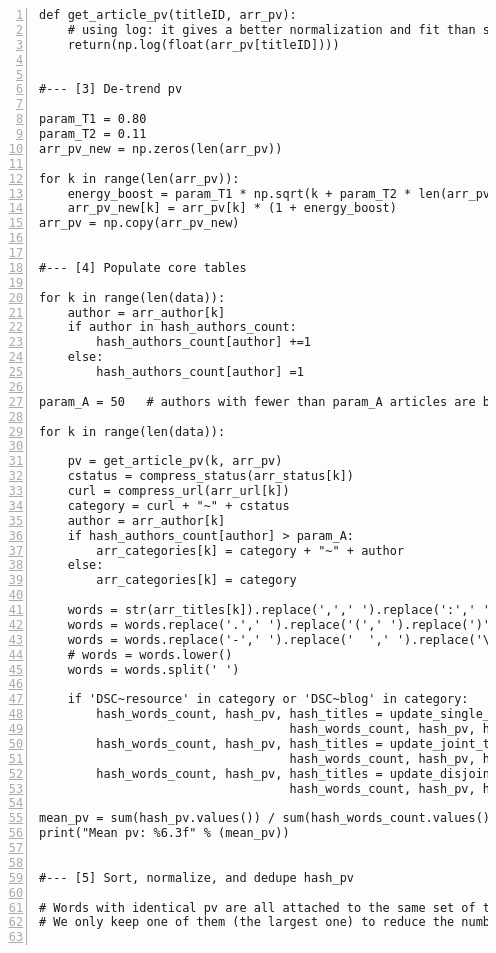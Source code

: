 \documentclass[oneside,10pt]{book}
\begin{document}
\begin{lstlisting}[numbers=left]
def get_article_pv(titleID, arr_pv):  
    # using log: it gives a better normalization and fit than sqrt, for pv distribution
    return(np.log(float(arr_pv[titleID])))


#--- [3] De-trend pv 

param_T1 = 0.80
param_T2 = 0.11 
arr_pv_new = np.zeros(len(arr_pv)) 

for k in range(len(arr_pv)):
    energy_boost = param_T1 * np.sqrt(k + param_T2 * len(arr_pv))
    arr_pv_new[k] = arr_pv[k] * (1 + energy_boost) 
arr_pv = np.copy(arr_pv_new)    


#--- [4] Populate core tables 

for k in range(len(data)):
    author = arr_author[k]
    if author in hash_authors_count:
        hash_authors_count[author] +=1
    else:
        hash_authors_count[author] =1

param_A = 50   # authors with fewer than param_A articles are bundled together

for k in range(len(data)):

    pv = get_article_pv(k, arr_pv) 
    cstatus = compress_status(arr_status[k])
    curl = compress_url(arr_url[k])
    category = curl + "~" + cstatus
    author = arr_author[k]
    if hash_authors_count[author] > param_A:
        arr_categories[k] = category + "~" + author
    else:
        arr_categories[k] = category

    words = str(arr_titles[k]).replace(',',' ').replace(':',' ').replace('?', ' ')
    words = words.replace('.',' ').replace('(',' ').replace(')', ' ')
    words = words.replace('-',' ').replace('  ',' ').replace('\xa0', ' ') 
    # words = words.lower() 
    words = words.split(' ')

    if 'DSC~resource' in category or 'DSC~blog' in category: 
        hash_words_count, hash_pv, hash_titles = update_single_tokens(k, words, 
                                   hash_words_count, hash_pv, hash_titles)
        hash_words_count, hash_pv, hash_titles = update_joint_tokens(k, words, 
                                   hash_words_count, hash_pv, hash_titles)
        hash_words_count, hash_pv, hash_titles = update_disjoint_tokens(k, words, 
                                   hash_words_count, hash_pv, hash_titles)

mean_pv = sum(hash_pv.values()) / sum(hash_words_count.values())
print("Mean pv: %6.3f" % (mean_pv))             


#--- [5] Sort, normalize, and dedupe hash_pv

# Words with identical pv are all attached to the same set of titles
# We only keep one of them (the largest one) to reduce the number of words


\end{lstlisting}
\end{document}

